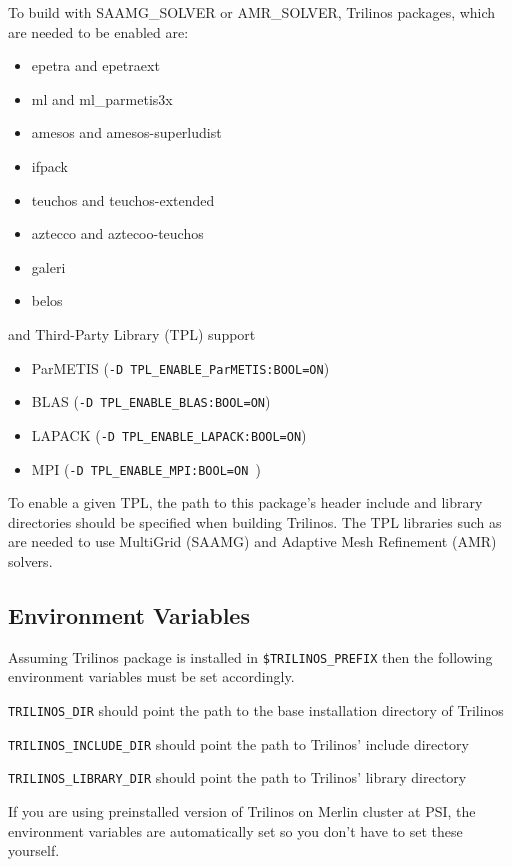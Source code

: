 To build {\opal} with {SAAMG\_SOLVER} or {AMR\_SOLVER}, Trilinos packages, which are needed to be enabled are:
\begin{itemize}
  \item epetra and epetraext
  \item ml and ml\_parmetis3x
  \item amesos and amesos-superludist
  \item ifpack
  \item teuchos and teuchos-extended
  \item aztecco and aztecoo-teuchos
  \item galeri
  \item belos
\end{itemize}
and Third-Party Library (TPL) support
 \begin{itemize}
  \item ParMETIS (\texttt{-D TPL\_ENABLE\_ParMETIS:BOOL=ON})
  \item BLAS  (\texttt{-D TPL\_ENABLE\_BLAS:BOOL=ON})
  \item LAPACK (\texttt{-D TPL\_ENABLE\_LAPACK:BOOL=ON})
  \item MPI (\texttt{-D TPL\_ENABLE\_MPI:BOOL=ON })
\end{itemize}
To enable a given TPL,  the path to this package's header include and library directories should be specified
when building Trilinos. The TPL libraries such as  are needed
to use MultiGrid (SAAMG) and Adaptive Mesh Refinement (AMR) solvers.

\subsection{Environment Variables}
\label{ssec:envvar_MG}

Assuming Trilinos package is installed in \texttt{\$TRILINOS\_PREFIX} then the following environment variables must be set accordingly.

\texttt{TRILINOS\_DIR} should point the path to the base installation directory of Trilinos

\texttt{TRILINOS\_INCLUDE\_DIR} should point the path to Trilinos' include directory

\texttt{TRILINOS\_LIBRARY\_DIR} should point the path to Trilinos' library directory

If you are using preinstalled version of Trilinos on Merlin cluster at PSI, the environment variables
are automatically set so you don't have to set these yourself.

